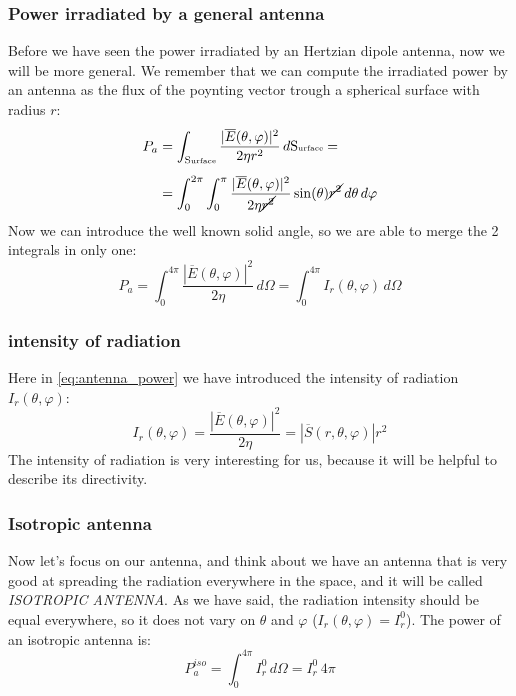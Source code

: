 \subsubsection*{Power irradiated by a general antenna}
Before we have seen the power irradiated by an Hertzian dipole antenna, now we will be more general. We remember that we can compute the irradiated power by an antenna as the flux of the poynting vector trough a spherical surface with radius $r$:
\begin{align}
    \begin{split}
        P_a&=\int_{\text{S\tiny{urface}}}\frac{|\overline{E}(\theta,\varphi)|^2}{2\eta r^2}\,d\text{S\tiny{urface}}=\\[5pt]
        &=\int_0^{2\pi}\int_0^\pi \frac{|\overline{E}(\theta,\varphi)|^2}{2\eta\cancel{r^2}}\sin(\theta)\cancel{r^2}\,d\theta\,d\varphi
    \end{split}
\end{align}
Now we can introduce the well known solid angle, so we are able to merge the 2 integrals in only one:
\begin{equation}\label{eq:antenna_power}
    P_a=\int_0^{4\pi}\frac{|\overline{E}(\theta,\varphi)|^2}{2\eta}\,d\Omega=\int_0^{4\pi}I_r(\theta,\varphi)\,d\Omega
\end{equation}
\subsubsection*{intensity of radiation}
Here in \cref{eq:antenna_power} we have introduced the intensity of radiation $I_r(\theta,\varphi)$:
\begin{equation}\label{eq:radiation_intensity}
    I_r(\theta,\varphi)=\frac{|\overline{E}(\theta,\varphi)|^2}{2\eta}=|\overline{S}(r,\theta,\varphi)|r^2
\end{equation}
The intensity of radiation is very interesting for us, because it will be helpful to describe its directivity.
\subsubsection*{Isotropic antenna}
Now let's focus on our antenna, and think about we have an antenna that is very good at spreading the radiation everywhere in the space, and it will be called \emph{ISOTROPIC ANTENNA}. As we have said, the radiation intensity should be equal everywhere, so it does not vary on $\theta$ and $\varphi$ ($I_r(\theta,\varphi)=I_r^0$). The power of an isotropic antenna is:
\begin{equation}\label{eq:power_isotropic_antenna}
    P_a^{iso}=\int_0^{4\pi}I^0_r\,d\Omega=I^0_r\,4\pi
\end{equation}
